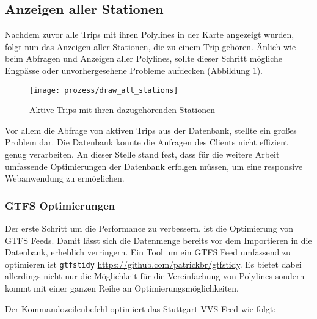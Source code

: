 \subsection{Anzeigen aller Stationen}
\label{sub:anzeigen_aller_stationen}

  Nachdem zuvor alle Trips mit ihren Polylines in der Karte angezeigt wurden, folgt nun das Anzeigen aller Stationen, die zu einem Trip gehören. Änlich wie beim Abfragen und Anzeigen aller Polylines, sollte dieser Schritt mögliche Engpässe oder unvorhergesehene Probleme aufdecken (Abbildung \ref{fig:prozess/draw_all_stations}).

  \begin{figure}[htbp]
     \begin{center}
       \texttt{[image: prozess/draw\_all\_stations]}
       \caption{Aktive Trips mit ihren dazugehörenden Stationen}
       \label{fig:prozess/draw_all_stations}
     \end{center}
   \end{figure}
   
  Vor allem die Abfrage von aktiven Trips aus der Datenbank, stellte ein großes Problem dar. Die Datenbank konnte die Anfragen des Clients nicht effizient genug verarbeiten. An dieser Stelle stand fest, dass für die weitere Arbeit umfassende Optimierungen der Datenbank erfolgen müssen, um eine responsive Webanwendung zu ermöglichen. 

  \subsubsection{GTFS Optimierungen}
  \label{ssub:gtfs_optimierungen}
    Der erste Schritt um die Performance zu verbessern, ist die Optimierung von GTFS Feeds. Damit lässt sich die Datenmenge bereits vor dem Importieren in die Datenbank, erheblich verringern. Ein Tool um ein GTFS Feed umfassend zu optimieren ist \texttt{gtfstidy} \url{https://github.com/patrickbr/gtfstidy}. Es bietet dabei allerdings nicht nur die Möglichkeit für die Vereinfachung von Polylines sondern kommt mit einer ganzen Reihe an Optimierungsmöglichkeiten. 

    Der Kommandozeilenbefehl \colorbox{materialGrey}{\texttt{\color{white}{\$ gtfstidy -sSiRDeO input.zip output}}} optimiert das Stuttgart-VVS Feed wie folgt:
    
